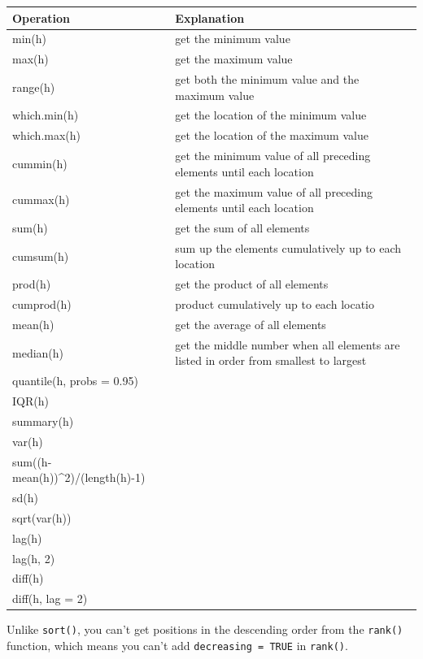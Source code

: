\documentclass[
]{book}
\newenvironment{infobox}[1]
  {
  \begin{itemize}
  \renewcommand{\labelitemi}{
    \raisebox{-.7\height}[0pt][0pt]{
      {\setkeys{Gin}{width=3em,keepaspectratio}
        \texttt{[image: pics/\#1]}}
    }
  }
  \setlength{\fboxsep}{1em}
  \begin{blackbox}
  \item
  }
  {
  \end{blackbox}
  \end{itemize}
  }
\newenvironment{blackbox}{
  \definecolor{shadecolor}{rgb}{0, 0, 0}  %
  \color{white}
  \begin{shaded}}
 {\end{shaded}}
\begin{document}
\begin{tabular}{l|l}
\hline
Operation & Explanation\\
\hline
min(h) & get the minimum value\\
\hline
max(h) & get the maximum value\\
\hline
range(h) & get both the minimum value and the maximum value\\
\hline
which.min(h) & get the location of the minimum value\\
\hline
which.max(h) & get the location of the maximum value\\
\hline
cummin(h) & get the minimum value of all preceding elements until each location\\
\hline
cummax(h) & get the maximum value of all preceding elements until each location\\
\hline
sum(h) & get the sum of all elements\\
\hline
cumsum(h) & sum up the elements cumulatively up to each location\\
\hline
prod(h) & get the product of all elements\\
\hline
cumprod(h) & product cumulatively up to each locatio\\
\hline
mean(h) & get the average of all elements\\
\hline
median(h) & get the middle number when all elements are listed in order from smallest to largest\\
\hline
quantile(h, probs = 0.95) & \\
\hline
IQR(h) & \\
\hline
summary(h) & \\
\hline
var(h) & \\
\hline
sum((h-mean(h))\textasciicircum{}2)/(length(h)-1) & \\
\hline
sd(h) & \\
\hline
sqrt(var(h)) & \\
\hline
lag(h) & \\
\hline
lag(h, 2) & \\
\hline
diff(h) & \\
\hline
diff(h, lag = 2) & \\
\hline
\end{tabular}

\begin{infobox}{caution}
Unlike \texttt{sort()}, you can't get positions in the descending order from the \texttt{rank()} function, which means you can't add \texttt{decreasing\ =\ TRUE} in \texttt{rank()}.

\end{infobox}
\end{document}
